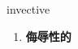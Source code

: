 
\begin{frame}
{\huge invective}
\begin{center}
\begin{enumerate}\Large
  \item \textbf{侮辱性的}
\end{enumerate}
\end{center}
\end{frame}
